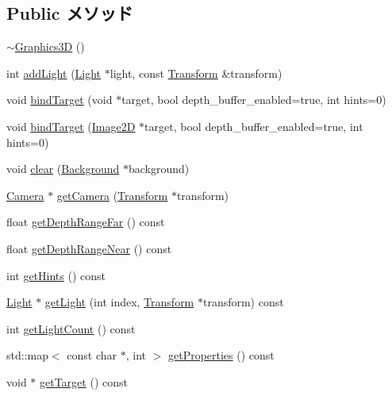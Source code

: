 \subsection*{Public メソッド}
\begin{CompactItemize}
\item 
\hyperlink{classm3g_1_1Graphics3D_9b9347476fc10e57b31694ac8a628511}{$\sim$Graphics3D} ()
\item 
int \hyperlink{classm3g_1_1Graphics3D_0a8acc61618bad17053cb62131819b92}{addLight} (\hyperlink{classm3g_1_1Light}{Light} $\ast$light, const \hyperlink{classm3g_1_1Transform}{Transform} \&transform)
\item 
void \hyperlink{classm3g_1_1Graphics3D_d34fb1ab11f2e25b98b93affd71dcc05}{bindTarget} (void $\ast$target, bool depth\_\-buffer\_\-enabled=true, int hints=0)
\item 
void \hyperlink{classm3g_1_1Graphics3D_b775163cbe39d177e255011e381cd9f8}{bindTarget} (\hyperlink{classm3g_1_1Image2D}{Image2D} $\ast$target, bool depth\_\-buffer\_\-enabled=true, int hints=0)
\item 
void \hyperlink{classm3g_1_1Graphics3D_21c4a68a53cfbe0a7cec05d5a56682bf}{clear} (\hyperlink{classm3g_1_1Background}{Background} $\ast$background)
\item 
\hyperlink{classm3g_1_1Camera}{Camera} $\ast$ \hyperlink{classm3g_1_1Graphics3D_1c6ba79e9112caef92e1a149a308b613}{getCamera} (\hyperlink{classm3g_1_1Transform}{Transform} $\ast$transform)
\item 
float \hyperlink{classm3g_1_1Graphics3D_c8c185b99073215202d2e35723f5c470}{getDepthRangeFar} () const 
\item 
float \hyperlink{classm3g_1_1Graphics3D_60bc116f673bf2782de2df3eebfb2c92}{getDepthRangeNear} () const 
\item 
int \hyperlink{classm3g_1_1Graphics3D_5837234a23dc5f46d3adec17f521b58e}{getHints} () const 
\item 
\hyperlink{classm3g_1_1Light}{Light} $\ast$ \hyperlink{classm3g_1_1Graphics3D_02e7b19ae5c0342b11f2cbf9a4df4d77}{getLight} (int index, \hyperlink{classm3g_1_1Transform}{Transform} $\ast$transform) const 
\item 
int \hyperlink{classm3g_1_1Graphics3D_7a08cfeb48d76ad5d8859a1fc0c77d98}{getLightCount} () const 
\item 
std::map$<$ const char $\ast$, int $>$ \hyperlink{classm3g_1_1Graphics3D_2ea2a069c4b10555d50a193a44e63996}{getProperties} () const 
\item 
void $\ast$ \hyperlink{classm3g_1_1Graphics3D_02d0033930c8e68f4d7ebd43abe7980a}{getTarget} () const 

\end{CompactItemize}
